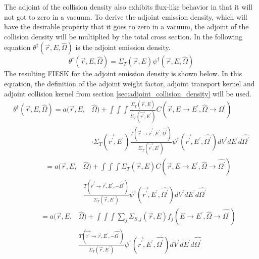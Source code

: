 The adjoint of the collision density also exhibits flux-like behavior in that
it will not got to zero in a vacuum. To derive the adjoint emission density,
which will have the desirable property that it goes to zero in a vacuum, the
adjoint of the collision density will be multiplied by the total cross section.
In the following equation $\theta^{\dagger}(\vec{r},E,\hat{\Omega})$ is the
adjoint emission density.
\begin{equation}
  \theta^{\dagger}(\vec{r},E,\hat{\Omega}) = \Sigma_T(\vec{r},E)
  \psi^{\dagger}(\vec{r},E,\hat{\Omega})
  \label{eq:adj_emission_dens_to_adj_of_collision_dens}
\end{equation}
The resulting FIESK for the adjoint emission density is shown below. In this
equation, the definition of the adjoint weight factor, adjoint transport 
kernel and adjoint collision kernel from section 
\ref{sec:adjoint_collision_density} will be used.
\begin{equation*}
  \begin{split}
    \theta^{\dagger}(\vec{r},E,\hat{\Omega}) = a(\vec{r},E,&\hat{\Omega}) + 
    \int\int\int \frac{\Sigma_T(\vec{r},E)}{\Sigma_T(\vec{r^{'}},E^{'})}
    C(\vec{r},E \to E^{'},\hat{\Omega} \to \hat{\Omega^{'}}) \\
    & \cdot \Sigma_T(\vec{r^{'}},E^{'})
    \frac{T(\vec{r} \to \vec{r^{'}},E^{'},\hat{\Omega^{'}})}
         {\Sigma_T(\vec{r^{'}},E^{'})}
    \psi^{\dagger}(\vec{r^{'}},E^{'},\hat{\Omega^{'}}) dV^{'}dE^{'}d\hat{\Omega^{'}}
  \end{split}
\end{equation*}
\begin{equation*}
  \begin{split}
    \quad \quad = a(\vec{r},E,&\hat{\Omega}) + 
    \int\int\int \Sigma_T(\vec{r},E) 
    C(\vec{r},E \to E^{'},\hat{\Omega} \to \hat{\Omega^{'}}) \\
    & \frac{T(\vec{r^{'}} \to \vec{r},E^{'},-\hat{\Omega^{'}})}
           {\Sigma_T(\vec{r},E^{'})}
    \psi^{\dagger}(\vec{r^{'}},E^{'},\hat{\Omega^{'}}) dV^{'}dE^{'}d\hat{\Omega^{'}}
  \end{split}
\end{equation*}
\begin{equation*}
  \begin{split}
    \quad \quad = a(\vec{r},E,&\hat{\Omega}) + 
    \int\int\int \sum_j \Sigma_{S,j}(\vec{r},E) 
    f_j(E \to E^{'},\hat{\Omega} \to \hat{\Omega^{'}}) \\
    & \frac{T(\vec{r^{'}} \to \vec{r},E^{'},-\hat{\Omega^{'}})}
           {\Sigma_T(\vec{r},E^{'})}
    \psi^{\dagger}(\vec{r^{'}},E^{'},\hat{\Omega^{'}}) dV^{'}dE^{'}d\hat{\Omega^{'}}
  \end{split}
\end{equation*}
